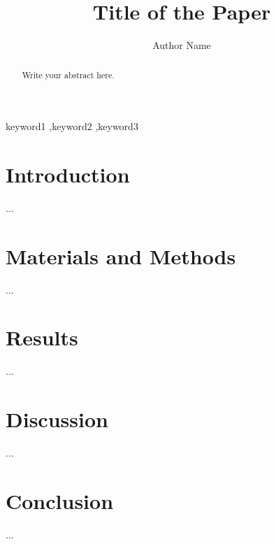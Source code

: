 \documentclass[preprint,12pt]{elsarticle}
\begin{document}
\begin{frontmatter}

\title{Title of the Paper}

\author[inst1]{Author Name}

\begin{abstract}
Write your abstract here.
\end{abstract}

\begin{keyword}
keyword1 \sep keyword2 \sep keyword3
\end{keyword}

\end{frontmatter}

\section{Introduction}
...

\section{Materials and Methods}
...

\section{Results}
...

\section{Discussion}
...

\section{Conclusion}
...
\end{document}
